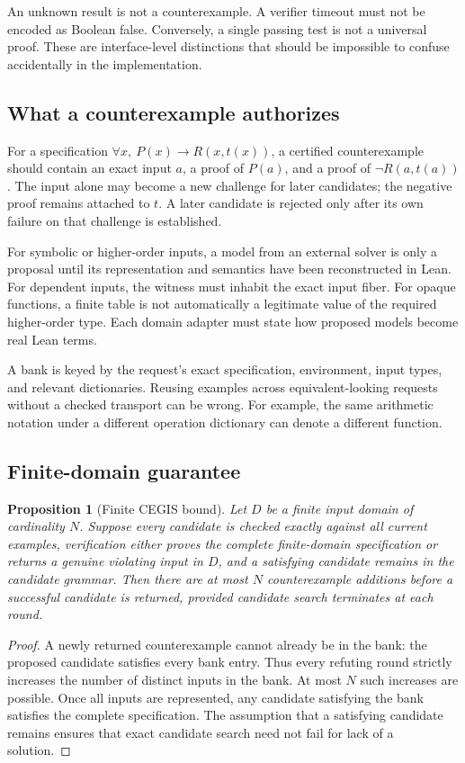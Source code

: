 \documentclass[11pt,letterpaper]{article}
\newtheorem{proposition}[theorem]{Proposition}
\theoremstyle{definition}
\theoremstyle{remark}
\begin{document}
An unknown result is not a counterexample. A verifier timeout must not be encoded as Boolean false. Conversely, a single passing test is not a universal proof. These are interface-level distinctions that should be impossible to confuse accidentally in the implementation.

\subsection{What a counterexample authorizes}

For a specification $\forall x,\ P(x)\to R(x,t(x))$, a certified counterexample should contain an exact input $a$, a proof of $P(a)$, and a proof of $\neg R(a,t(a))$. The input alone may become a new challenge for later candidates; the negative proof remains attached to $t$. A later candidate is rejected only after its own failure on that challenge is established.

For symbolic or higher-order inputs, a model from an external solver is only a proposal until its representation and semantics have been reconstructed in Lean. For dependent inputs, the witness must inhabit the exact input fiber. For opaque functions, a finite table is not automatically a legitimate value of the required higher-order type. Each domain adapter must state how proposed models become real Lean terms.

A bank is keyed by the request's exact specification, environment, input types, and relevant dictionaries. Reusing examples across equivalent-looking requests without a checked transport can be wrong. For example, the same arithmetic notation under a different operation dictionary can denote a different function.

\subsection{Finite-domain guarantee}

\begin{proposition}[Finite CEGIS bound]
Let $D$ be a finite input domain of cardinality $N$. Suppose every candidate is checked exactly against all current examples, verification either proves the complete finite-domain specification or returns a genuine violating input in $D$, and a satisfying candidate remains in the candidate grammar. Then there are at most $N$ counterexample additions before a successful candidate is returned, provided candidate search terminates at each round.
\end{proposition}
\begin{proof}
A newly returned counterexample cannot already be in the bank: the proposed candidate satisfies every bank entry. Thus every refuting round strictly increases the number of distinct inputs in the bank. At most $N$ such increases are possible. Once all inputs are represented, any candidate satisfying the bank satisfies the complete specification. The assumption that a satisfying candidate remains ensures that exact candidate search need not fail for lack of a solution.
\end{proof}
\end{document}

